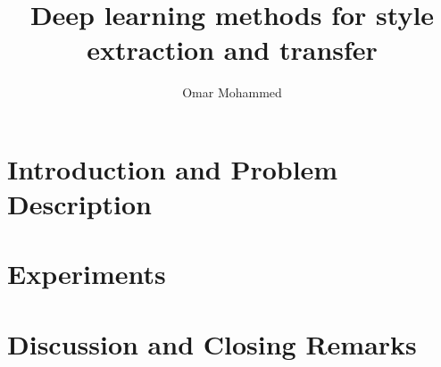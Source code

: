 \documentclass[11pt,a4paper,twoside, leqno]{book}
\title{Deep learning methods for style extraction and transfer}
\author{Omar Mohammed}
\date{}
\begin{document}
\maketitle

\dominitoc%
\tableofcontents

\listoffigures

\listoftables

\part{Introduction and Problem Description}





\part{Experiments}






\part{Discussion and Closing Remarks}




\appendix




% 
{\small }
\end{document}
